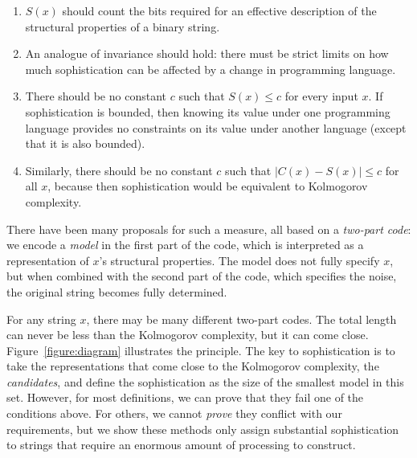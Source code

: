 \begin{enumerate}
\item $S(x)$ should count the bits required for an effective description of the structural properties of a binary string.
\item An analogue of invariance should hold: there must be strict limits on how much sophistication can be affected by a change in programming language.
\item There should be no constant $c$ such that $S(x)\le c$ for every input $x$. If sophistication is bounded, then knowing its value under one programming language provides no constraints on its value under another language (except that it is also bounded). 
\item Similarly, there should be no constant $c$ such that $\left | C(x)-S(x)\right |\le c$ for all $x$, because then sophistication would be equivalent to Kolmogorov complexity. 
\end{enumerate}
There have been many proposals for such a measure, all based on a \emph{two-part code}: we encode a \emph{model} in the first part of the code, which is interpreted as a representation of $x$'s structural properties. The model does not fully specify $x$, but when combined with the second part of the code, which specifies the noise, the original string becomes fully determined.\footnotemark


For any string $x$, there may be many different two-part codes. The total length can never be less than the Kolmogorov complexity, but it can come close. Figure~\ref{figure:diagram} illustrates the principle. The key to sophistication is to take the representations that come close to the Kolmogorov complexity, the \emph{candidates}, and define the sophistication as the size of the smallest model in this set. However, for most definitions, we can prove that they fail one of the conditions above. For others, we cannot \emph{prove} they conflict with our requirements, but we show these methods only assign substantial sophistication to strings that require an enormous amount of processing to construct. 

